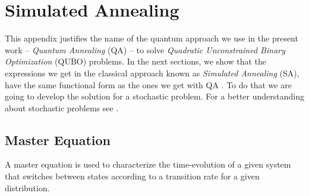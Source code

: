 
\chapter{Simulated Annealing} %

This appendix justifies the name of the quantum approach we use in the present work -- \textit{Quantum Annealing} (QA) -- to solve \textit{Quadratic Unconstrained Binary Optimization} (QUBO) problems. In the next sections, we show that the expressions we get in the classical approach known as \textit{Simulated Annealing} (SA), have the same functional form as the ones we get with QA \cite{Kadowaki1998QuantumModel}. To do that we are going to develop the solution for a stochastic problem. For a better understanding about stochastic problems see \cite{Schneider2006StochasticOptimization}. 
\label{AppendixB} %
\section{Master Equation}
A master equation is used to characterize the time-evolution of a given system that switches between states according to a transition rate for a given distribution.
